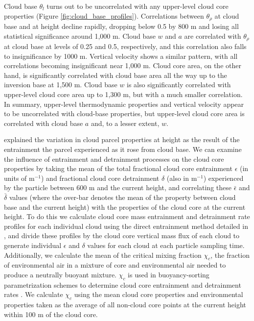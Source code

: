 \documentclass[acp]{copernicus}
\begin{document}
Cloud base $\theta_l$ turns out to be uncorrelated with any upper-level 
cloud core properties (Figure \ref{fig:cloud_base_profiles}).  Correlations 
between $\theta_\rho$ at cloud base and at height decline rapidly, dropping 
below 0.5 by 800 m and losing all statistical significance around 1,000 m.  
Cloud base $w$ and $a$ are correlated with $\theta_\rho$ at cloud base at 
levels of 0.25 and 0.5, respectively, and this correlation also falls to 
insignificance by 1000 m.  Vertical velocity shows a similar pattern, with all 
correlations becoming insignificant near 1,000 m.  Cloud core area, on the 
other hand, is significantly correlated with cloud base area all the way up to 
the inversion base at 1,500 m.  Cloud base $w$ is also significantly correlated 
with upper-level cloud core area up to 1,300 m, but with a much smaller 
correlation.  In summary, upper-level thermodynamic properties and vertical 
velocity appear to be uncorrelated with cloud-base properties, but upper-level 
cloud core area is correlated with cloud base $a$ and, to a lesser extent, $w$.

\cite{Romps2010a} explained the variation in cloud parcel properties at height 
as the result of the entrainment the parcel experienced as it rose from 
cloud base.  We can examine the influence of entrainment and detrainment 
processes on the cloud core properties by taking the mean of the total 
fractional cloud core entrainment $\epsilon$ (in units of m$^{-1}$) and 
fractional cloud core detrainment $\delta$ (also in m$^{-1}$) experienced by 
the particle between 600 m and the current height, and correlating these
$\bar{\epsilon}$ and $\bar{\delta}$ values (where the over-bar denotes the 
mean of the property between cloud base and the current height) with the 
properties of the cloud core at the current height.  To do this we calculate 
cloud core mass entrainment and detrainment rate profiles for each individual 
cloud using the direct entrainment method detailed in \cite{Dawe2011}, and 
divide these profiles by the cloud core vertical mass flux of each cloud to 
generate individual $\epsilon$ and $\delta$ values for each cloud at each 
particle sampling time.  Additionally, we calculate the mean of the critical 
mixing fraction $\chi_c$, the fraction of environmental air in a mixture of 
core and environmental air needed to produce a neutrally buoyant mixture.  
$\chi_c$ is used in buoyancy-sorting parametrization schemes to determine 
cloud core entrainment and detrainment rates \citep{Kain1990, Rooy2008}.  We 
calculate $\chi_c$ using the mean cloud core properties and environmental 
properties taken as the average of all non-cloud core points at the current 
height within 100 m of the cloud core.
\end{document}
